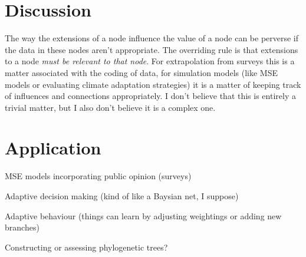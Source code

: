 \section{Discussion}


The way the extensions of a node influence the value of a node can be
perverse if the data in these nodes aren't appropriate.  The
overriding rule is that extensions to a node \emph{must be relevant to
  that node}. For extrapolation from surveys this is a matter associated
with the coding of data, for simulation models (like MSE models or
evaluating climate adaptation strategies) it is a matter of keeping
track of influences and connections appropriately.  I don't believe
that this is entirely a trivial matter, but I also don't believe it is
a complex one.



\section{Application}

MSE models incorporating public opinion (surveys)

Adaptive decision making (kind of like a Baysian net, I suppose)

Adaptive behaviour (things can learn by adjusting weightings or
adding new branches)

Constructing or assessing phylogenetic trees? 




